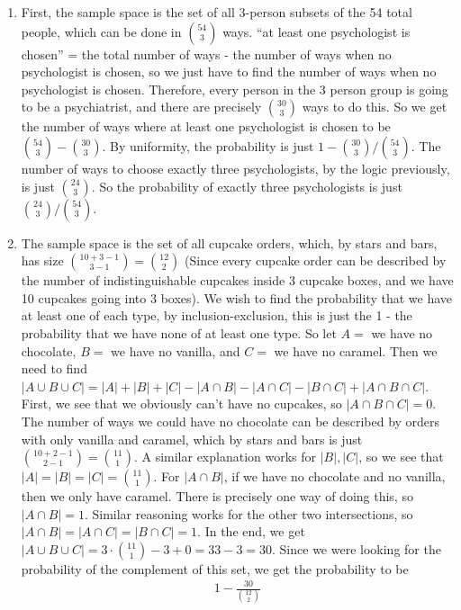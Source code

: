 \documentclass[12pt]{article}
\theoremstyle{definition}
\theoremstyle{remark}
\begin{document}
\begin{enumerate}[leftmargin=\labelsep]
\begin{enumerate}
			\item First, the sample space is the set of all 3-person subsets of the 54 total people, which can be done in ${54 \choose 3}$ ways. ``at least one psychologist is chosen'' = the total number of ways - the number of ways when no psychologist is chosen, so we just have to find the number of ways when no psychologist is chosen. Therefore, every person in the 3 person group is going to be a psychiatrist, and there are precisely ${30 \choose 3}$ ways to do this. So we get the number of ways where at least one psychologist is chosen to be ${54 \choose 3} - {30 \choose 3}$. By uniformity, the probability is just $1 - {30 \choose 3}/{54 \choose 3}$. The number of ways to choose exactly three psychologists, by the logic previously, is just ${24 \choose 3}$. So the probability of exactly three psychologists is just ${24 \choose 3} / {54 \choose 3}$.
			
			\item The sample space is the set of all cupcake orders, which, by stars and bars, has size ${10 + 3 - 1 \choose 3 - 1} = {12 \choose 2}$ (Since every cupcake order can be described by the number of indistinguishable cupcakes inside 3 cupcake boxes, and we have 10 cupcakes going into 3 boxes). We wish to find the probability that we have at least one of each type, by inclusion-exclusion, this is just the 1 - the probability that we have none of at least one type. So let $A = $ we have no chocolate, $B = $ we have no vanilla, and $C = $ we have no caramel. Then we need to find $|A \cup B \cup C| = |A| + |B| + |C| - |A \cap B| - |A \cap C| - |B \cap C| + |A \cap B \cap C|$. First, we see that we obviously can't have no cupcakes, so $|A \cap B \cap C| = 0$. The number of ways we could have no chocolate can be described by orders with only vanilla and caramel, which by stars and bars is just ${10 + 2 - 1 \choose 2 - 1} = {11 \choose 1}$. A similar explanation works for $|B|, |C|$, so we see that $|A| = |B| = |C| = {11 \choose 1}$. For $|A \cap B|$, if we have no chocolate and no vanilla, then we only have caramel. There is precisely one way of doing this, so $|A \cap B| = 1$. Similar reasoning works for the other two intersections, so $|A \cap B| = |A \cap C| = |B \cap C| = 1$. In the end, we get $|A \cup B \cup C| = 3 \cdot {11 \choose 1} - 3 + 0 = 33 - 3 = 30$. Since we were looking for the probability of the complement of this set, we get the probability to be 
			\begin{align*}
				1 - \frac{30}{{12 \choose 2}}
			\end{align*}
		\end{enumerate}
	

\end{enumerate}
\end{document}
